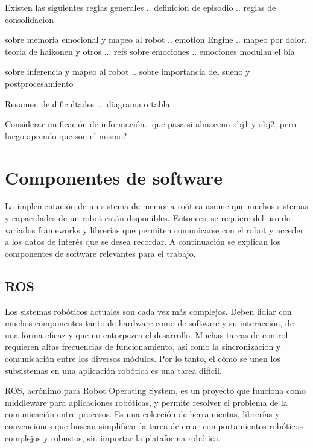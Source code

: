 Existen las siguientes reglas generales
.. definicion de episodio \cite{Dodd2005}
.. reglas de consolidacion \cite{Dodd2005}


sobre memoria emocional y mapeo al robot
.. emotion Engine \cite{Kasap2010}
.. mapeo por dolor. teoria de haikonen y otros \cite{Dodd2005}
... refs sobre emociones \cite{Deutsch2008}
.. emociones modulan el bla \cite{Deutsch2008}

sobre inferencia y mapeo al robot
.. sobre importancia del sueno y postprocesamiento \cite{Kelley2014}

Resumen de dificultades ... diagrama o tabla.



Considerar unificaci\'on de informaci\'on.. que pasa si almaceno obj1 y obj2, pero luego aprendo que son el mismo?



\section{Componentes de software}

La implementaci\'on de un sistema de memoria ro\'otica asume que muchos sistemas y capacidades de un robot est\'an disponibles. Entonces, se requiere del uso de variados frameworks y librer\'ias que permiten comunicarse con el robot y acceder a los datos de inter\'es que se desea recordar. A continuaci\'on se explican los componentes de software relevantes para el trabajo.

\subsection{ROS}

Los sistemas rob\'oticos actuales son cada vez m\'as complejos. Deben lidiar con muchos componentes tanto de hardware como de software y su interacci\'on, de una forma eficaz y que no entorpezca el desarrollo. Muchas tareas de control requieren altas frecuencias de funcionamiento, as\'i como la sincronizaci\'on y comunicaci\'on entre los diversos m\'odulos. Por lo tanto, el c\'omo se unen los subsistemas en una aplicaci\'on rob\'otica es una tarea dif\'icil.

ROS\cite{ROS:2009}, acr\'onimo para Robot Operating System, es un proyecto que funciona como middleware para aplicaciones rob\'oticas, y permite resolver el problema de la comunicaci\'on entre procesos. Es una colecci\'on de herramientas, librer\'ias y convenciones que buscan simplificar la tarea de crear comportamientos rob\'oticos complejos y robustos, sin importar la plataforma rob\'otica.

